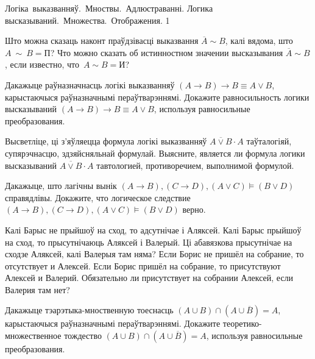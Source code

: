 



\quizTitle
{Логіка~выказванняў.~Мноствы.~Адлюстраванні.}
{Логика высказываний.~Множества.~Отображения.}
{1}

\begin{problemList}

\problemItemSimple
{Што можна сказаць наконт праўдзівасці выказвання $\overline{A} \sim B$, калі вядома, што~$A~\sim~B = \mbox{П}$?}
{Что можно сказать об истинностном значении высказывания $\overline{A} \sim B$, если известно, что~$A \sim B = \mbox{И}$?}

\bigskip

\problemItemSimple
{Дакажыце раўназначнасць логікі выказванняў $(A \to B) \to B \equiv A \vee B$, карыстаючыся раўназначнымі пераўтварэннямі.}
{Докажите равносильность логики высказываний $(A \to B) \to B \equiv A \vee B$, используя равносильные преобразования.}

\bigskip

\problemItemSimple
{Высветліце, ці з'яўляецца формула логікі выказванняў $\overline{A \vee B} \cdot A$ таўталогіяй, супярэчнасцю, здзяйсняльнай формулай.}
{Выясните, является ли формула логики высказываний $\overline{A \vee B} \cdot A$ тавтологией, противоречием, выполнимой формулой.}

\bigskip

\problemItemSimple
{Дакажыце, што лагічны вынік $(A \to B), (C \to D), (A \vee C) \models (B \vee D)$ справядлівы.}
{Докажите, что логическое следствие $(A \to B), (C \to D), (A \vee C) \models (B \vee D)$ верно.}

\bigskip

\problemItemSimple
{Калі Барыс не прыйшоў на сход, то адсутнічае і Аляксей. Калі Барыс прыйшоў на сход, то прысутнічаюць Аляксей і Валерый.
Ці абавязкова прысутнічае на сходзе Аляксей, калі Валерыя там няма?}
{Если Борис не пришёл на собрание, то отсутствует и Алексей. Если Борис пришёл на собрание, то присутствуют Алексей и Валерий.
Обязательно ли присутствует на собрании Алексей, если Валерия там нет?}

\bigskip

\problemItemSimple
{Дакажыце тэарэтыка-мноственную тоеснасць $(A \cup B) \cap (A \cup \overline{B}) = A$, карыстаючыся раўназначнымі пераўтварэннямі.}
{Докажите теоретико-множественное тождество $(A \cup B) \cap (A \cup \overline{B}) = A$, используя равносильные преобразования.}

\bigskip


\end{problemList}
